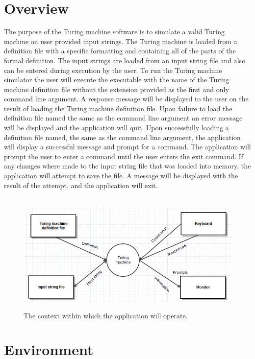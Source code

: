 \documentclass{report}
\begin{document}
\chapter{Overview}
 	The purpose of the Turing machine software is to simulate a valid Turing machine on user provided input strings. The Turing machine is loaded from a definition file with a specific formatting and containing all of the parts of the formal definition. The input strings are loaded from an input string file and also can be entered during execution by the user. To run the Turing machine simulator the user will execute the executable with the name of the Turing machine definition file without the extension provided as the first and only command line argument. A response message will be displayed to the user on the result of loading the Turing machine definition file. Upon failure to load the definition file named the same as the command line argument an error message will be displayed and the application will quit. Upon successfully loading a definition file named, the same as the command line argument, the application will display a successful message and prompt for a command. The application will prompt the user to enter a command until the user enters the exit command. If any changes where made to the input string file that was loaded into memory, the application will attempt to save the file. A message will be displayed with the result of the attempt, and the application will exit.
   
   	\pagebreak
    \begin{figure}[!ht]
  		\centering
   		 \
      	\includegraphics[scale=0.85]{context.png}
  \caption{The context within which the application will operate.}
\end{figure}

    

\chapter{Environment}
 
\end{document}
